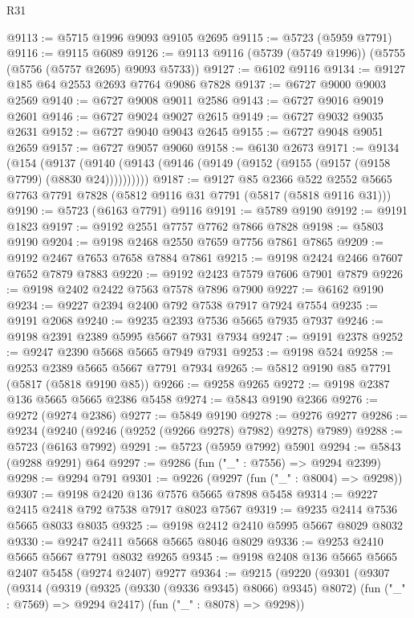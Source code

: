 \begin{lexlean}{R31}
\begin{coremodule}
@9113 := @5715 @1996 @9093 @9105 @2695
@9115 := @5723 (@5959 @7791)
@9116 := @9115 @6089
@9126 := @9113 @9116 (@5739 (@5749 @1996)) (@5755 (@5756 (@5757 @2695) @9093 @5733))
@9127 := @6102 @9116
@9134 := @9127 @185 @64 @2553 @2693 @7764 @9086 @7828
@9137 := @6727 @9000 @9003 @2569
@9140 := @6727 @9008 @9011 @2586
@9143 := @6727 @9016 @9019 @2601
@9146 := @6727 @9024 @9027 @2615
@9149 := @6727 @9032 @9035 @2631
@9152 := @6727 @9040 @9043 @2645
@9155 := @6727 @9048 @9051 @2659
@9157 := @6727 @9057 @9060
@9158 := @6130 @2673
@9171 := @9134
    (@154 (@9137 (@9140 (@9143 (@9146 (@9149 (@9152 (@9155 (@9157 (@9158 @7799) (@8830 @24))))))))))
@9187 := @9127
    @85
    @2366
    @522
    @2552
    @5665
    @7763
    @7791
    @7828
    (@5812 @9116 @31 @7791 (@5817 (@5818 @9116 @31)))
@9190 := @5723 (@6163 @7791) @9116
@9191 := @5789 @9190
@9192 := @9191 @1823
@9197 := @9192 @2551 @7757 @7762 @7866 @7828
@9198 := @5803 @9190
@9204 := @9198 @2468 @2550 @7659 @7756 @7861 @7865
@9209 := @9192 @2467 @7653 @7658 @7884 @7861
@9215 := @9198 @2424 @2466 @7607 @7652 @7879 @7883
@9220 := @9192 @2423 @7579 @7606 @7901 @7879
@9226 := @9198 @2402 @2422 @7563 @7578 @7896 @7900
@9227 := @6162 @9190
@9234 := @9227 @2394 @2400 @792 @7538 @7917 @7924 @7554
@9235 := @9191 @2068
@9240 := @9235 @2393 @7536 @5665 @7935 @7937
@9246 := @9198 @2391 @2389 @5995 @5667 @7931 @7934
@9247 := @9191 @2378
@9252 := @9247 @2390 @5668 @5665 @7949 @7931
@9253 := @9198 @524
@9258 := @9253 @2389 @5665 @5667 @7791 @7934
@9265 := @5812 @9190 @85 @7791 (@5817 (@5818 @9190 @85))
@9266 := @9258 @9265
@9272 := @9198 @2387 @136 @5665 @5665 @2386 @5458
@9274 := @5843 @9190 @2366
@9276 := @9272 (@9274 @2386)
@9277 := @5849 @9190
@9278 := @9276 @9277
@9286 := @9234 (@9240 (@9246 (@9252 (@9266 @9278) @7982) @9278) @7989)
@9288 := @5723 (@6163 @7992)
@9291 := @5723 (@5959 @7992) @5901
@9294 := @5843 (@9288 @9291) @64
@9297 := @9286 (fun ("_" : @7556) => @9294 @2399)
@9298 := @9294 @791
@9301 := @9226 (@9297 (fun ("_" : @8004) => @9298))
@9307 := @9198 @2420 @136 @7576 @5665 @7898 @5458
@9314 := @9227 @2415 @2418 @792 @7538 @7917 @8023 @7567
@9319 := @9235 @2414 @7536 @5665 @8033 @8035
@9325 := @9198 @2412 @2410 @5995 @5667 @8029 @8032
@9330 := @9247 @2411 @5668 @5665 @8046 @8029
@9336 := @9253 @2410 @5665 @5667 @7791 @8032 @9265
@9345 := @9198 @2408 @136 @5665 @5665 @2407 @5458 (@9274 @2407) @9277
@9364 := @9215
    (@9220
      (@9301
        (@9307
          (@9314
            (@9319 (@9325 (@9330 (@9336 @9345) @8066) @9345) @8072)
            (fun ("_" : @7569) => @9294 @2417)
            (fun ("_" : @8078) => @9298))

\end{coremodule}
\end{lexlean}

